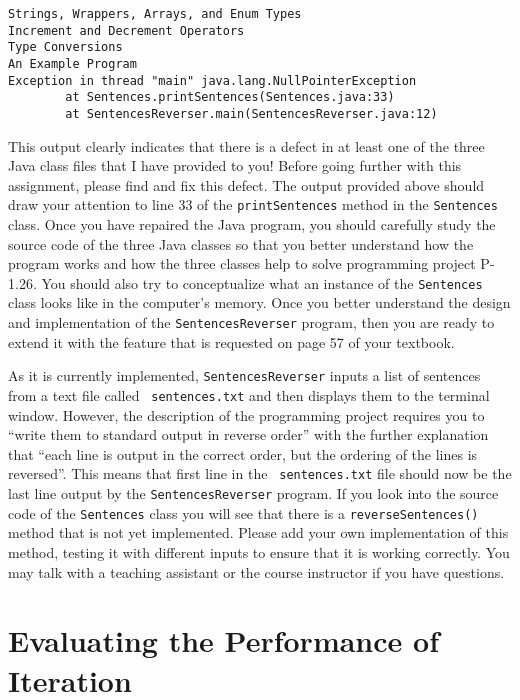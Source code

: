 \begin{verbatim}
Strings, Wrappers, Arrays, and Enum Types
Increment and Decrement Operators
Type Conversions
An Example Program
Exception in thread "main" java.lang.NullPointerException
        at Sentences.printSentences(Sentences.java:33)
        at SentencesReverser.main(SentencesReverser.java:12)
\end{verbatim}

This output clearly indicates that there is a defect in at least one of the three Java class files that I have provided
to you! Before going further with this assignment, please find and fix this defect. The output provided above should
draw your attention to line 33 of the {\tt printSentences} method in the {\tt Sentences} class. Once you have repaired
the Java program, you should carefully study the source code of the three Java classes so that you better understand how
the program works and how the three classes help to solve programming project P-1.26. You should also try to
conceptualize what an instance of the {\tt Sentences} class looks like in the computer's memory. Once you better
understand the design and implementation of the {\tt SentencesReverser} program, then you are ready to extend it with
the feature that is requested on page 57 of your textbook.

As it is currently implemented, {\tt SentencesReverser} inputs a list of sentences from a text file called {\tt
sentences.txt} and then displays them to the terminal window. However, the description of the programming project
requires you to ``write them to standard output in reverse order'' with the further explanation that ``each line is
output in the correct order, but the ordering of the lines is reversed''. This means that first line in the {\tt
sentences.txt} file should now be the last line output by the {\tt SentencesReverser} program. If you look into the
source code of the {\tt Sentences} class you will see that there is a {\tt reverseSentences()} method that is not yet
implemented. Please add your own implementation of this method, testing it with different inputs to ensure that it is
working correctly. You may talk with a teaching assistant or the course instructor if you have questions.

\section*{Evaluating the Performance of Iteration}

